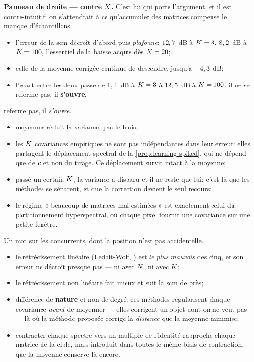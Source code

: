 \textbf{Panneau de droite --- contre $K$.} C'est lui qui porte l'argument,
et il est contre-intuitif: on s'attendrait à ce qu'accumuler des matrices
compense le manque d'échantillons.
\begin{itemize}
  \item l'erreur de la scm décroît d'abord puis \emph{plafonne}:
    $12{,}7$~dB à $K=3$, $8{,}2$~dB à $K=100$, l'essentiel de la
    baisse acquis dès $K=20$;
  \item celle de la moyenne corrigée continue de descendre, jusqu'à
    $-4{,}3$~dB;
  \item l'écart entre les deux passe de $1{,}4$~dB à $K=3$ à $12{,}5$~dB à
    $K=100$: il ne se referme pas, il \textbf{s'ouvre}.
\end{itemize}
referme pas, il \emph{s'ouvre}.
\begin{remark}
\label{rem:learning-moyenner-ne-suffit-pas}
  \begin{itemize}
    \item moyenner réduit la variance, pas le biais;
    \item les $K$ covariances empiriques ne sont pas indépendantes dans
      leur erreur: elles partagent le déplacement spectral de la
      \cref{prop:learning-spiked}, qui ne dépend que de $c$ et non du
      tirage. Ce déplacement survit intact à la moyenne;
    \item passé un certain $K$, la variance a disparu et il ne reste que
      lui: c'est là que les méthodes se séparent, et que la correction devient
      le seul recours;
    \item le régime « beaucoup de matrices mal estimées » est exactement celui
      du partitionnement hyperspectral, où chaque pixel fournit une covariance
      sur une petite fenêtre.
  \end{itemize}
  \leavevmode
\end{remark}

Un mot sur les concurrents, dont la position n'est pas accidentelle.
\begin{itemize}
  \item le rétrécissement linéaire (Ledoit-Wolf, ) est \emph{le
    plus mauvais} des cinq, et son erreur ne décroît presque pas --- ni avec
    $N$, ni avec $K$;
  \item le rétrécissement non linéaire fait mieux et suit la scm de près;
  \item différence de \textbf{nature} et non de degré: ces méthodes
    régularisent chaque covariance \emph{avant} de moyenner --- elles corrigent
    un objet dont on ne veut pas --- là où la méthode proposée corrige la
    \emph{distance} que la moyenne minimise;
  \item contracter chaque spectre vers un multiple de l'identité rapproche
    chaque matrice de la cible, mais introduit dans toutes le même biais de
    contraction, que la moyenne conserve là encore.
\end{itemize}


